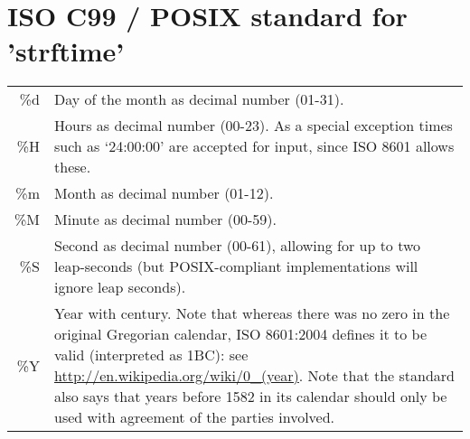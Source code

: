 \documentclass{scrartcl}
\begin{document}
\appendix

\section{ISO C99 / POSIX standard for 'strftime'}\label{app:posix}
\begin{tabular}{rp{14cm}} 
\%d & Day of the month as decimal number (01-31).\\
\%H & Hours as decimal number (00-23).  As a special exception times such as ‘24:00:00’ are accepted for input, since ISO 8601 allows these.\\
\%m & Month as decimal number (01-12).\\
\%M & Minute as decimal number (00-59).\\
\%S & Second as decimal number (00-61), allowing for up to two leap-seconds (but POSIX-compliant implementations will ignore leap seconds).\\
\%Y & Year with century.  Note that whereas there was no zero in the original Gregorian calendar, ISO 8601:2004 defines it to be valid (interpreted as 1BC): see \url{http://en.wikipedia.org/wiki/0_(year)}.  Note that the standard also says that years before 1582 in its calendar should only be used with agreement of the parties involved.
\end{tabular}
\end{document}
